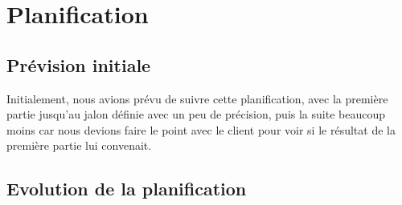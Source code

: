 \documentclass[11pt]{report}
\begin{document}
\newpage
\section{Planification}
\subsection{Prévision initiale}
Initialement, nous avions prévu de suivre cette planification, avec la
première partie jusqu'au jalon définie avec un peu de précision, puis la suite
beaucoup moins car nous devions faire le point avec le client pour voir si le
résultat de la première partie lui convenait.
\par

\begin{landscape}

\end{landscape}
\clearpage

\subsection{Evolution de la planification}
\end{document}
